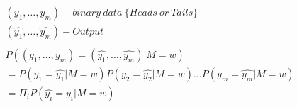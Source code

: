 \documentclass[10pt]{article}
\begin{document}
\begin{align*}& (y_1, \dots,y_m) - binary\ data\ \{Heads\ or\ Tails\} \\
& (\hat{y_1}, \dots,\hat{y_m}) - Output \\
\\
& P((y_1, \dots,y_m) = (\hat{y_1}, \dots,\hat{y_m}) | M = w) \\
& = P(y_1 = \hat{y_1} | M = w)P(y_2 = \hat{y_2} | M = w) \dots P(y_m = \hat{y_m} | M = w) \\
& = \Pi_i P(\hat{y_i} = y_i | M = w)\end{align*}
\end{document}
